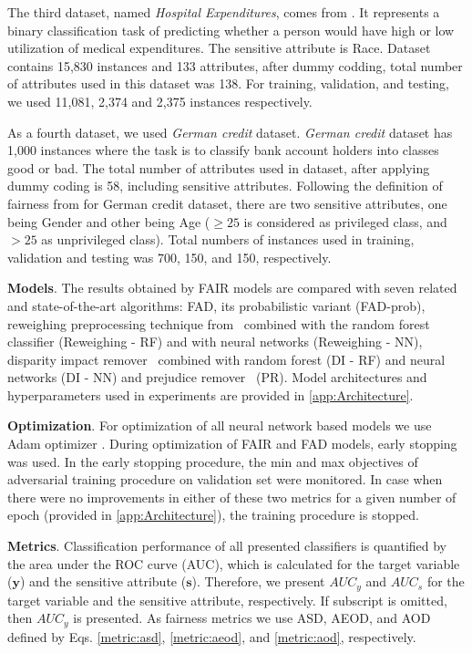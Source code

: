 \documentclass[preprint,12pt]{elsarticle}
\begin{document}
The third dataset, named \textit{Hospital Expenditures}, comes from \cite{bellamy2019ai}. It represents a binary classification task of predicting whether a person would have high or low utilization of medical expenditures. The sensitive attribute is Race. Dataset contains 15,830 instances and 133 attributes, after dummy codding, total number of attributes used in this dataset was 138. For training, validation, and testing, we used 11,081, 2,374 and 2,375 instances respectively.

As a fourth dataset, we used \textit{German credit} dataset. \textit{German credit} dataset has 1,000 instances where the task is to classify bank account holders into classes good or bad. The total number of attributes used in dataset, after applying dummy coding is 58, including sensitive attributes. Following the definition of fairness from \cite{kamiran2012decision} for German credit dataset, there are two sensitive attributes, one being Gender and other being Age ($\geq 25$ is considered as privileged class, and $> 25$ as unprivileged class).  Total numbers of instances used in training, validation and testing was 700, 150, and 150, respectively.

\textbf{Models}. \sloppy The results obtained by FAIR models are compared with seven related and state-of-the-art algorithms: FAD, its probabilistic variant (FAD-prob), reweighing preprocessing technique from~\cite{kamiran2012data} combined with the random forest classifier (Reweighing - RF) and with neural networks (Reweighing - NN), disparity impact remover~\cite{feldman2015certifying} combined with random forest (DI - RF) and neural networks (DI - NN) and prejudice remover~\cite{kamishima2012fairness} (PR). Model architectures and hyperparameters used in experiments are provided in \ref{app:Architecture}.

\textbf{Optimization}.
For optimization of all neural network based models we use Adam optimizer \cite{ADAM}.
During optimization of FAIR and FAD models, early stopping was used. In the early stopping procedure, the min and max objectives of adversarial training procedure on validation set were monitored. In case when there were no improvements in either of these two metrics for a given number of epoch (provided in \ref{app:Architecture}), the training procedure is stopped.

\textbf{Metrics}.
Classification performance of all presented classifiers is quantified by the area under the ROC curve (AUC), which is calculated for the target variable ($\mathbf{y}$) and the sensitive attribute ($\mathbf{s}$). Therefore, we present $AUC_y$ and $AUC_s$ for the target variable and the sensitive attribute, respectively. If subscript is omitted, then $AUC_y$ is presented. As fairness metrics we use ASD, AEOD, and AOD defined by Eqs. \ref{metric:asd}, \ref{metric:aeod}, and \ref{metric:aod}, respectively. 
\end{document}
